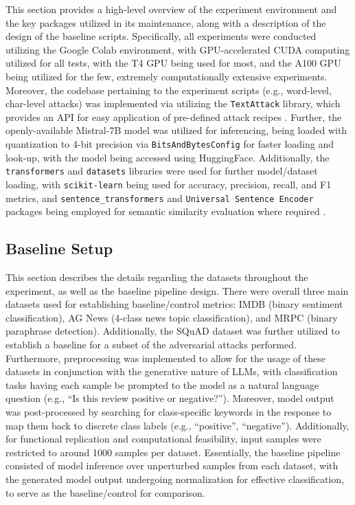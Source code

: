 \documentclass[conference]{IEEEtran}
\begin{document}
This section provides a high-level overview of the experiment environment and the key packages utilized in its maintenance, along with a description of the design of the baseline scripts. Specifically, all experiments were conducted utilizing the Google Colab environment, with GPU-accelerated CUDA computing utilized for all tests, with the T4 GPU being used for most, and the A100 GPU being utilized for the few, extremely computationally extensive experiments. Moreover, the codebase pertaining to the experiment scripts (e.g., word-level, char-level attacks) was implemented via utilizing the \texttt{TextAttack} library, which provides an API for easy application of pre-defined attack recipes \cite{textattack2020framework}. Further, the openly-available Mistral-7B model was utilized for inferencing, being loaded with quantization to 4-bit precision via \texttt{BitsAndBytesConfig} for faster loading and look-up, with the model being accessed using HuggingFace. Additionally, the \texttt{transformers} and \texttt{datasets} libraries were used for further model/dataset loading, with \texttt{scikit-learn} being used for accuracy, precision, recall, and F1 metrics, and \texttt{sentence\_transformers} and \texttt{Universal Sentence Encoder} packages being employed for semantic similarity evaluation where required \cite{cer2018use}.

\subsection{Baseline Setup}

This section describes the details regarding the datasets throughout the experiment, as well as the baseline pipeline design. There were overall three main datasets used for establishing baseline/control metrics: IMDB (binary sentiment classification), AG News (4-class news topic classification), and MRPC (binary paraphrase detection). Additionally, the SQuAD dataset was further utilized to establish a baseline for a subset of the adversarial attacks performed. Furthermore, preprocessing was implemented to allow for the usage of these datasets in conjunction with the generative nature of LLMs, with classification tasks having each sample be prompted to the model as a natural language question (e.g., ``Is this review positive or negative?''). Moreover, model output was post-processed by searching for class-specific keywords in the response to map them back to discrete class labels (e.g., ``positive'', ``negative''). Additionally, for functional replication and computational feasibility, input samples were restricted to around 1000 samples per dataset. Essentially, the baseline pipeline consisted of model inference over unperturbed samples from each dataset, with the generated model output undergoing normalization for effective classification, to serve as the baseline/control for comparison.
\end{document}
